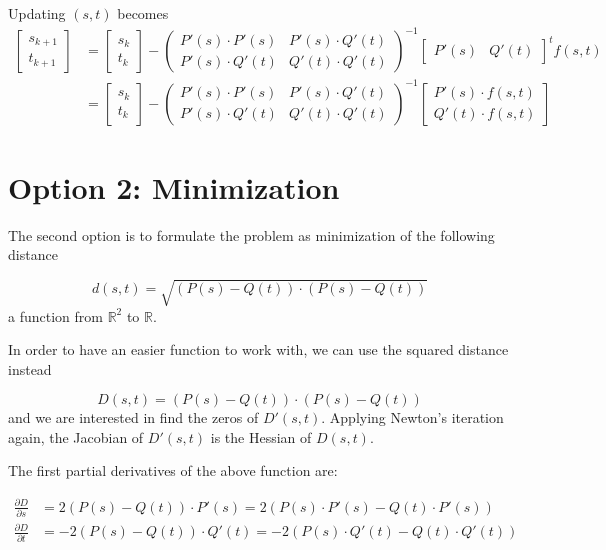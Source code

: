 \documentclass[11pt]{article}
\begin{document}
Updating $(s,t)$ becomes
\begin{align*}
  \begin{bmatrix}
    s_{k+1} \\t_{k+1}
  \end{bmatrix}
   & =
  \begin{bmatrix}
    s_{k} \\t_{k}
  \end{bmatrix}
  -
  \begin{pmatrix}
    P'(s) \cdot P'(s) & P'(s) \cdot Q'(t) \\
    P'(s) \cdot Q'(t) & Q'(t) \cdot Q'(t)
  \end{pmatrix}^{-1}
  \begin{bmatrix}
    P'(s) & Q'(t)
  \end{bmatrix}^t
  f(s,t) \\
   & =
  \begin{bmatrix}
    s_{k} \\t_{k}
  \end{bmatrix}
  -
  \begin{pmatrix}
    P'(s) \cdot P'(s) & P'(s) \cdot Q'(t) \\
    P'(s) \cdot Q'(t) & Q'(t) \cdot Q'(t)
  \end{pmatrix}^{-1}
  \begin{bmatrix}
    P'(s) \cdot f(s,t) \\
    Q'(t) \cdot f(s,t)
  \end{bmatrix}
\end{align*}

\clearpage
\section*{Option 2: Minimization}
The second option is to formulate the problem as minimization of the following distance

$$d(s,t) = \sqrt{(P(s) - Q(t)) \cdot (P(s)-Q(t))}$$
a function from $\mathbb{R}^2$ to $\mathbb{R}$.

In order to have an easier function to work with, we can use the squared distance instead

$$D(s,t) = (P(s) - Q(t)) \cdot (P(s)-Q(t))$$
and we are interested in find the zeros of $D'(s,t)$. Applying Newton's iteration again,
the Jacobian of $D'(s,t)$ is the Hessian of $D(s,t)$.

The first partial derivatives of the above function are:

\begin{align*}
  \frac{\partial D}{\partial s} & = 2(P(s) - Q(t)) \cdot P'(s) = 2(P(s) \cdot P'(s) - Q(t) \cdot P'(s)) \\
  \frac{\partial D}{\partial t} & = -2(P(s) - Q(t)) \cdot Q'(t) = -2(P(s)\cdot Q'(t) - Q(t)\cdot Q'(t))
\end{align*}
\end{document}
